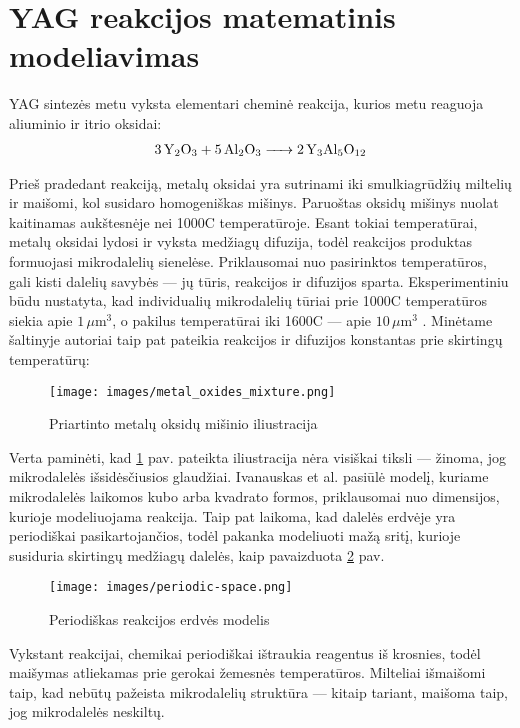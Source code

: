 \section{YAG reakcijos matematinis modeliavimas}

YAG sintezės metu vyksta elementari cheminė reakcija, kurios metu reaguoja aliuminio ir itrio oksidai:
\begin{align*}
  \ce{3Y_2O_3 + 5Al_2O_3 -> 2Y_3Al_5O_12}
\end{align*}

Prieš pradedant reakciją, metalų oksidai yra sutrinami iki smulkiagrūdžių miltelių ir maišomi, kol susidaro homogeniškas mišinys. Paruoštas oksidų mišinys nuolat kaitinamas aukštesnėje nei 1000\degree C temperatūroje. Esant tokiai temperatūrai, metalų oksidai lydosi ir vyksta medžiagų difuzija, todėl reakcijos produktas formuojasi mikrodalelių sienelėse. Priklausomai nuo pasirinktos temperatūros, gali kisti dalelių savybės — jų tūris, reakcijos ir difuzijos sparta. Eksperimentiniu būdu nustatyta, kad individualių mikrodalelių tūriai prie 1000\degree C temperatūros siekia apie $1\,\mu\text{m}^3$, o pakilus temperatūrai iki 1600\degree C — apie $10\,\mu\text{m}^3$ \cite{ivanauskasComputationalModellingYAG2009}. Minėtame šaltinyje autoriai taip pat pateikia reakcijos ir difuzijos konstantas prie skirtingų temperatūrų:

\begin{figure}[h]
  \centering
  \texttt{[image: images/metal\_oxides\_mixture.png]}
  \caption{Priartinto metalų oksidų mišinio iliustracija \cite{ivanauskasComputationalModellingYAG2009}}
  \label{fig:metal-oxides-mixuter}
\end{figure}

Verta paminėti, kad \ref{fig:metal-oxides-mixuter} pav. pateikta iliustracija nėra visiškai tiksli — žinoma, jog mikrodalelės išsidėsčiusios glaudžiai. Ivanauskas et al. \cite{ivanauskasModellingSolidState2005} pasiūlė modelį, kuriame mikrodalelės laikomos kubo arba kvadrato formos, priklausomai nuo dimensijos, kurioje modeliuojama reakcija. Taip pat laikoma, kad dalelės erdvėje yra periodiškai pasikartojančios, todėl pakanka modeliuoti mažą sritį, kurioje susiduria skirtingų medžiagų dalelės, kaip pavaizduota \ref{fig:periodic-space} pav.

\begin{figure}[h]
  \centering
  \texttt{[image: images/periodic-space.png]}
  \caption{Periodiškas reakcijos erdvės modelis}
  \label{fig:periodic-space}
\end{figure}

Vykstant reakcijai, chemikai periodiškai ištraukia reagentus iš krosnies, todėl maišymas atliekamas prie gerokai žemesnės temperatūros. Milteliai išmaišomi taip, kad nebūtų pažeista mikrodalelių struktūra — kitaip tariant, maišoma taip, jog mikrodalelės neskiltų.